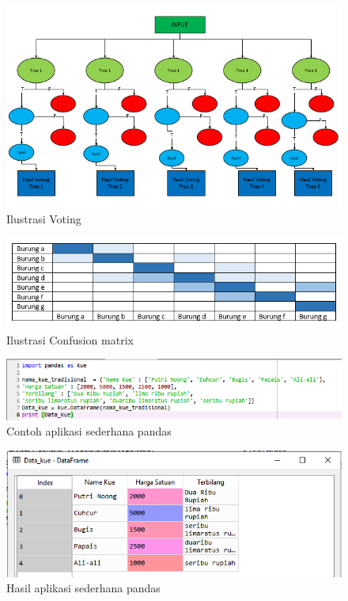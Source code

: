 \begin{figure}
      \centerline{\includegraphics[width=1\textwidth]
      {figures/cokro/c37}}
      \caption{Ilustrasi Voting}
      \label{c37}
      \end{figure}

\begin{figure}
      \centerline{\includegraphics[width=1\textwidth]
      {figures/cokro/c38}}
      \caption{Ilustrasi Confusion matrix}
      \label{c38}
      \end{figure}

\begin{figure}
      \centerline{\includegraphics[width=1\textwidth]
      {figures/cokro/c39}}
      \caption{Contoh aplikasi sederhana pandas}
      \label{c39}
      \end{figure}

\begin{figure}
      \centerline{\includegraphics[width=1\textwidth]
      {figures/cokro/c40}}
      \caption{Hasil aplikasi sederhana pandas}
      \label{c40}
      \end{figure}

